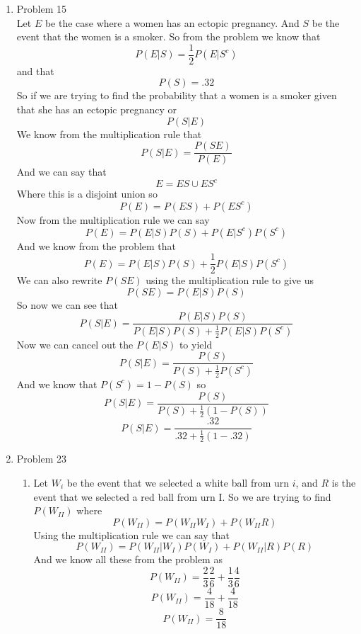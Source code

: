 \documentclass[11pt]{article}
\begin{document}
\begin{enumerate}
\item Problem 15\\
Let $E$ be the case where a women has an ectopic pregnancy. And $S$ be the event that the women is a smoker. So from the problem we know that
$$P(E|S) = \frac{1}{2}P(E|S^c)$$
and that 
$$P(S) = .32$$
So if we are trying to find the probability that a women is a smoker given that she has an ectopic pregnancy or
$$P(S|E)$$
We know from the multiplication rule that
$$P(S|E) = \frac{P(SE)}{P(E)}$$
And we can say that 
$$E =ES \cup ES^c$$
Where this is a disjoint union so 
$$P(E) = P(ES) +P(ES^c)$$
Now from the multiplication rule we can say
$$P(E) = P(E|S)P(S) +P(E|S^c)P(S^c)$$
And we know from the problem that
$$P(E) = P(E|S)P(S) +\frac{1}{2}P(E|S)P(S^c)$$
We can also rewrite $P(SE)$ using the multiplication rule to give us
$$P(SE) = P(E|S)P(S)$$
So now we can see that
$$P(S|E) = \frac{P(E|S)P(S)}{P(E|S)P(S) +\frac{1}{2}P(E|S)P(S^c)}$$
Now we can cancel out the $P(E|S)$ to yield
$$P(S|E) = \frac{P(S)}{P(S) +\frac{1}{2}P(S^c)}$$
And we know that $P(S^c) = 1-P(S)$ so
$$P(S|E) = \frac{P(S)}{P(S) +\frac{1}{2}(1-P(S))}$$
$$P(S|E) = \frac{.32}{.32 +\frac{1}{2}(1-.32)}$$

\begin{center}
\end{center}

\item Problem 23
\begin{enumerate}
\item
Let $W_i$ be the event that we selected a white ball from urn $i$, and $R$ is the event that we selected a red ball from urn I. So we are trying to find $P(W_{II})$ where 
$$P(W_{II}) = P(W_{II}W_I) + P(W_{II}R)$$
Using the multiplication rule we can say that
$$P(W_{II}) = P(W_{II}|W_I)P(W_I) + P(W_{II}|R)P(R)$$
And we know all these from the problem as
$$P(W_{II}) = \frac{2}{3}\frac{2}{6} +\frac{1}{3}\frac{4}{6}$$ 
$$P(W_{II}) = \frac{4}{18} +\frac{4}{18}$$ 
$$P(W_{II}) = \frac{8}{18}$$ 
\begin{center}
\end{center}


\end{enumerate}
\end{enumerate}
\end{document}
